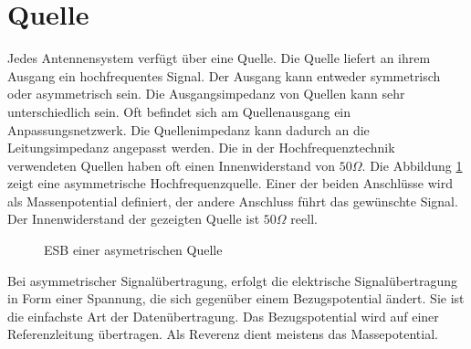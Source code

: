 \section{Quelle}
Jedes Antennensystem verfügt über eine Quelle.  Die Quelle liefert an ihrem Ausgang ein hochfrequentes Signal. Der Ausgang kann entweder symmetrisch oder asymmetrisch sein. Die Ausgangsimpedanz von Quellen kann sehr unterschiedlich sein. Oft befindet sich am Quellenausgang ein Anpassungsnetzwerk. Die Quellenimpedanz kann dadurch an die Leitungsimpedanz angepasst werden. Die in der Hochfrequenztechnik verwendeten Quellen haben oft einen Innenwiderstand von $50\Omega$. Die Abbildung \ref{fig:asymetrischeQuelle} zeigt eine asymmetrische  Hochfrequenzquelle. Einer der beiden Anschlüsse wird als Massenpotential definiert, der andere Anschluss führt das gewünschte Signal. Der Innenwiderstand der gezeigten Quelle ist $50\Omega$ reell.
\begin{figure}[!th]
	\begin{center}
	\end{center}
\caption{ESB einer asymetrischen Quelle}
\label{fig:asymetrischeQuelle}
\end{figure}
Bei asymmetrischer Signalübertragung, erfolgt die elektrische Signalübertragung in Form einer Spannung, die sich gegenüber einem Bezugspotential ändert. Sie ist die einfachste Art der Datenübertragung. Das Bezugspotential wird auf einer Referenzleitung übertragen. Als Reverenz dient meistens das  Massepotential. \\

